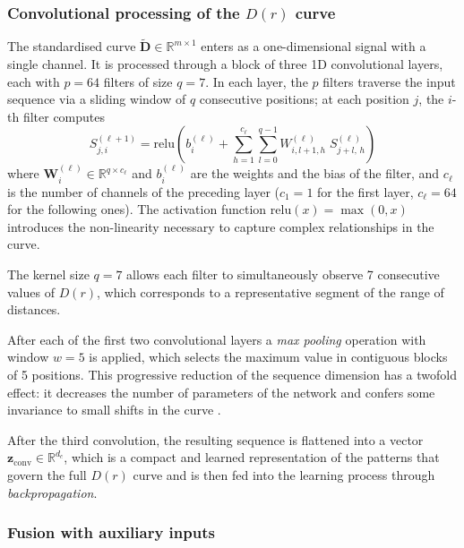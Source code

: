 \documentclass[a4paper,fleqn]{cas-sc}
\numberwithin{equation}{section}
\begin{document}
\subsubsection{Convolutional processing of the $D(r)$ curve}

The standardised curve
$\tilde{\mathbf{D}}\in\mathbb{R}^{m\times 1}$ enters as a
one-dimensional signal with a single channel. It is processed through
a block of three 1D convolutional layers, each with $p=64$ filters of
size $q=7$. In each layer, the $p$ filters traverse the input
sequence via a sliding window of $q$ consecutive positions; at each
position $j$, the $i$-th filter computes
\begin{equation}
    S^{(\ell+1)}_{j,i} = \mathrm{relu}\!\left(
    b^{(\ell)}_i + \sum_{h=1}^{c_\ell}\sum_{l=0}^{q-1}
    W^{(\ell)}_{i,l+1,h}\; S^{(\ell)}_{j+l,\,h}
    \right)
    \label{eq:conv1d}
\end{equation}
where $\mathbf{W}^{(\ell)}_i\in\mathbb{R}^{q\times c_\ell}$ and
$b^{(\ell)}_i$ are the weights and the bias of the filter, and
$c_\ell$ is the number of channels of the preceding layer ($c_1=1$
for the first layer, $c_\ell=64$ for the following ones). The
activation function $\mathrm{relu}(x)=\max(0,x)$ introduces the
non-linearity necessary to capture complex relationships in the curve.

The kernel size $q=7$ allows each filter to simultaneously observe 7
consecutive values of $D(r)$, which corresponds to a representative
segment of the range of distances.

After each of the first two convolutional layers a \emph{max pooling}
operation with window $w=5$ is applied, which selects the maximum
value in contiguous blocks of 5 positions. This progressive reduction
of the sequence dimension has a twofold effect: it decreases the
number of parameters of the network and confers some invariance to
small shifts in the curve \citep{biscione2021cnns}.

After the third convolution, the resulting sequence is flattened into
a vector $\mathbf{z}_{\mathrm{conv}}\in\mathbb{R}^{d_c}$, which is a
compact and learned representation of the patterns that govern the
full $D(r)$ curve and is then fed into the learning process through
\emph{backpropagation}.

\subsubsection{Fusion with auxiliary inputs}
\end{document}

